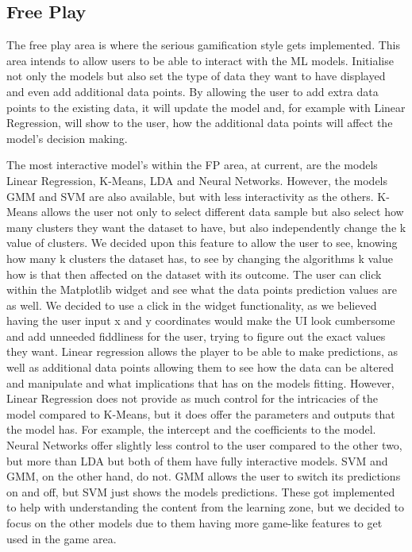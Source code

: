 	\subsection{Free Play}
	
	The free play area is where the serious gamification style gets implemented. This area intends to allow users to be able to interact with the ML models. Initialise not only the models but also set the type of data they want to have displayed and even add additional data points. By allowing the user to add extra data points to the existing data, it will update the model and, for example with Linear Regression, will show to the user, how the additional data points will affect the model's decision making.
	
	The most interactive model's within the FP area, at current, are the models Linear Regression, K-Means, LDA and Neural Networks. However, the models GMM and SVM are also available, but with less interactivity as the others. K-Means allows the user not only to select different data sample but also select how many clusters they want the dataset to have, but also independently change the k value of clusters. We decided upon this feature to allow the user to see, knowing how many k clusters the dataset has, to see by changing the algorithms k value how is that then affected on the dataset with its outcome. The user can click within the Matplotlib widget and see what the data points prediction values are as well. We decided to use a click in the widget functionality, as we believed having the user input x and y coordinates would make the UI look cumbersome and add unneeded fiddliness for the user, trying to figure out the exact values they want. Linear regression allows the player to be able to make predictions, as well as additional data points allowing them to see how the data can be altered and manipulate and what implications that has on the models fitting. However, Linear Regression does not provide as much control for the intricacies of the model compared to K-Means, but it does offer the parameters and outputs that the model has. For example, the intercept and the coefficients to the model. Neural Networks offer slightly less control to the user compared to the other two, but more than LDA but both of them have fully interactive models. SVM and GMM, on the other hand, do not. GMM allows the user to switch its predictions on and off, but SVM just shows the models predictions. These got implemented to help with understanding the content from the learning zone, but we decided to focus on the other models due to them having more game-like features to get used in the game area.
	
